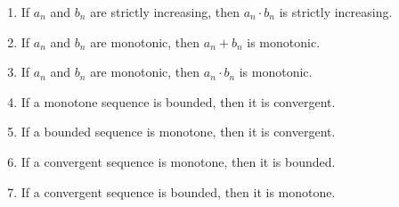 \documentclass[12pt,letterpaper]{article}
\theoremstyle{case}
\theoremstyle{definition}
\begin{document}
\begin{enumerate}
\begin{enumerate}
		\item If $a_n$ and $b_n$ are strictly increasing, then $a_n \cdot b_n$ is strictly increasing.
		
		\item If $a_n$ and $b_n$ are monotonic, then $a_n + b_n$ is monotonic.
		
		\item If $a_n$ and $b_n$ are monotonic, then $a_n \cdot b_n$ is monotonic.
		
		\item If a monotone sequence is bounded, then it is convergent.
		
		\item If a bounded sequence is monotone, then it is convergent.
		
		\item If a convergent sequence is monotone, then it is bounded.
		
		\item If a convergent sequence is bounded, then it is monotone.
	\end{enumerate}
	\end{enumerate}
\end{document}
